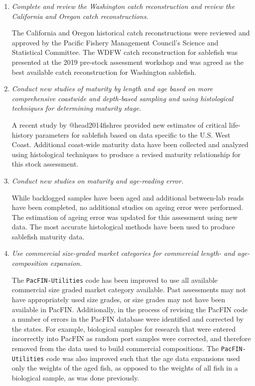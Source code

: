 \documentclass[11pt,
  english,
  a4paper,
]{article}
\begin{document}
\begin{enumerate}
\item \emph{Complete and review the Washington catch reconstruction and review the California and Oregon catch reconstructions.}

The California and Oregon historical catch reconstructions were reviewed and approved by the Pacific Fishery Management Council's Science and Statistical Committee. The WDFW catch reconstruction for sablefish was presented at the 2019 pre-stock assessment workshop and was agreed as the best available catch reconstruction for Washington sablefish.

\item \emph{Conduct new studies of maturity by length and age based on more comprehensive coastwide and depth-based sampling and using histological techniques for determining maturity stage.}

A recent study by {@head2014fishres} provided new estimates of critical life-history parameters for sablefish based on data specific to the U.S. West Coast. Additional coast-wide maturity data have been collected and analyzed using histological techniques to produce a revised maturity relationship for this stock assessment.

\item \emph{Conduct new studies on maturity and age-reading error.}

While backlogged samples have been aged and additional between-lab reads have been completed, no additional studies on ageing error were performed. The estimation of ageing error was updated for this assessment using new data. The most accurate histological methods have been used to produce sablefish maturity data.

\item \emph{Use commercial size-graded market categories for commercial length- and age-composition expansion.}

 The \texttt{PacFIN-Utilities} code has been improved to use all available commercial size graded market category available. Past assessments may not have appropriately used size grades, or size grades may not have been available in PacFIN. Additionally, in the process of revising the PacFIN code a number of errors in the PacFIN database were identified and corrected by the states. For example, biological samples for research that were entered incorrectly into PacFIN as random port samples were corrected, and therefore removed from the data used to build commercial compositions. The \texttt{PacFIN-Utilities} code was also improved such that the age data expansions used only the weights of the aged fish, as opposed to the weights of all fish in a biological sample, as was done previously.


\end{enumerate}
\end{document}
